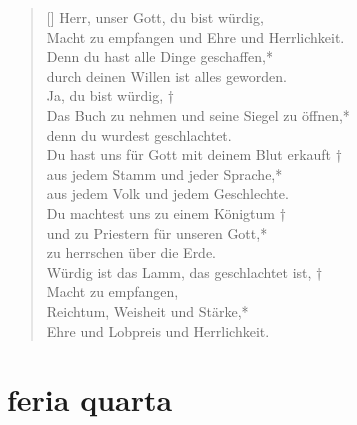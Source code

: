 \vspace{0.6cm}

\begin{verse}[\versewidth]
Herr, unser Gott, du bist würdig,\\
Macht zu empfangen und Ehre und Herrlichkeit.\\
\vin Denn du hast alle Dinge geschaffen,*\\
\vin durch deinen Willen ist alles geworden.\\
Ja, du bist würdig, †\\
Das Buch zu nehmen und seine Siegel zu öffnen,*\\
denn du wurdest geschlachtet.\\
\vin Du hast uns für Gott mit deinem Blut erkauft †\\
\vin aus jedem Stamm und jeder Sprache,*\\
\vin aus jedem Volk und jedem Geschlechte.\\
Du machtest uns zu einem Königtum †\\
und zu Priestern für unseren Gott,*\\
zu herrschen über die Erde.\\

\vin Würdig ist das Lamm, das geschlachtet ist, †\\
\vin Macht zu empfangen,\\ 
\vin Reichtum, Weisheit und Stärke,*\\
\vin Ehre und Lobpreis und Herrlichkeit.\\

\end{verse}

\section{feria quarta}


